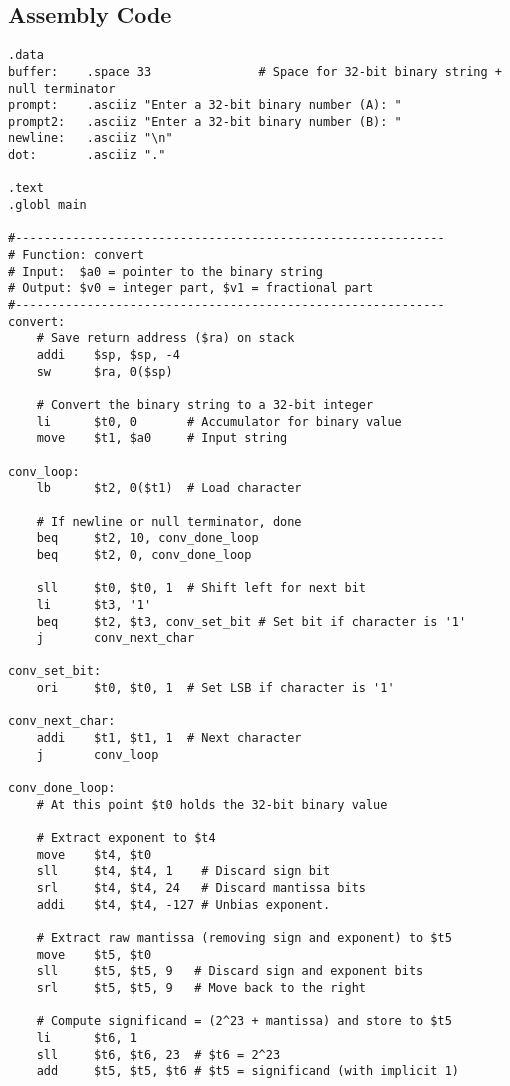 \documentclass[a4paper]{article}
\begin{document}
\newpage
\subsection*{Assembly Code}
\begin{verbatim}
.data
buffer:    .space 33               # Space for 32-bit binary string + null terminator
prompt:    .asciiz "Enter a 32-bit binary number (A): "
prompt2:   .asciiz "Enter a 32-bit binary number (B): "
newline:   .asciiz "\n"
dot:       .asciiz "."

.text
.globl main

#------------------------------------------------------------
# Function: convert
# Input:  $a0 = pointer to the binary string
# Output: $v0 = integer part, $v1 = fractional part
#------------------------------------------------------------
convert:
    # Save return address ($ra) on stack
    addi    $sp, $sp, -4
    sw      $ra, 0($sp)

    # Convert the binary string to a 32-bit integer
    li      $t0, 0       # Accumulator for binary value
    move    $t1, $a0     # Input string

conv_loop:
    lb      $t2, 0($t1)  # Load character

    # If newline or null terminator, done
    beq     $t2, 10, conv_done_loop
    beq     $t2, 0, conv_done_loop

    sll     $t0, $t0, 1  # Shift left for next bit
    li      $t3, '1'
    beq     $t2, $t3, conv_set_bit # Set bit if character is '1'
    j       conv_next_char

conv_set_bit:
    ori     $t0, $t0, 1  # Set LSB if character is '1'

conv_next_char:
    addi    $t1, $t1, 1  # Next character
    j       conv_loop

conv_done_loop:
    # At this point $t0 holds the 32-bit binary value
    
    # Extract exponent to $t4
    move    $t4, $t0
    sll     $t4, $t4, 1    # Discard sign bit
    srl     $t4, $t4, 24   # Discard mantissa bits
    addi    $t4, $t4, -127 # Unbias exponent.

    # Extract raw mantissa (removing sign and exponent) to $t5
    move    $t5, $t0
    sll     $t5, $t5, 9   # Discard sign and exponent bits
    srl     $t5, $t5, 9   # Move back to the right

    # Compute significand = (2^23 + mantissa) and store to $t5
    li      $t6, 1
    sll     $t6, $t6, 23  # $t6 = 2^23
    add     $t5, $t5, $t6 # $t5 = significand (with implicit 1)


\end{verbatim}
\end{document}
